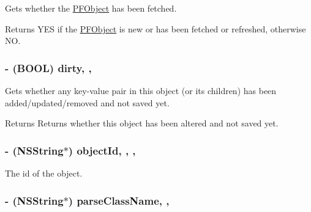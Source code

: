  





Gets whether the {\ttfamily \hyperlink{interface_p_f_object}{P\+F\+Object}} has been fetched.

\begin{DoxyReturn}{Returns}
{\ttfamily Y\+E\+S} if the \hyperlink{interface_p_f_object}{P\+F\+Object} is new or has been fetched or refreshed, otherwise {\ttfamily N\+O}. 
\end{DoxyReturn}
\hypertarget{interface_p_f_object_a7de11c083384297eb896760eab880ecf}{}
\subsubsection[{dirty}]{\setlength{\rightskip}{0pt plus 5cm}-\/ (B\+O\+O\+L) dirty\hspace{0.3cm}{\ttfamily [read]}, {\ttfamily [nonatomic]}, {\ttfamily [assign]}}\label{interface_p_f_object_a7de11c083384297eb896760eab880ecf}




 





Gets whether any key-\/value pair in this object (or its children) has been added/updated/removed and not saved yet.

\begin{DoxyReturn}{Returns}
Returns whether this object has been altered and not saved yet. 
\end{DoxyReturn}
\hypertarget{interface_p_f_object_ac957b8fb3842dcf264264c3f4af836f6}{}
\subsubsection[{object\+Id}]{\setlength{\rightskip}{0pt plus 5cm}-\/ (N\+S\+String$\ast$) object\+Id\hspace{0.3cm}{\ttfamily [read]}, {\ttfamily [write]}, {\ttfamily [nonatomic]}, {\ttfamily [strong]}}\label{interface_p_f_object_ac957b8fb3842dcf264264c3f4af836f6}
The id of the object. \hypertarget{interface_p_f_object_acd02c0585de1cc52e3adae4f3ea631aa}{}
\subsubsection[{parse\+Class\+Name}]{\setlength{\rightskip}{0pt plus 5cm}-\/ (N\+S\+String$\ast$) parse\+Class\+Name\hspace{0.3cm}{\ttfamily [read]}, {\ttfamily [nonatomic]}, {\ttfamily [strong]}}\label{interface_p_f_object_acd02c0585de1cc52e3adae4f3ea631aa}




